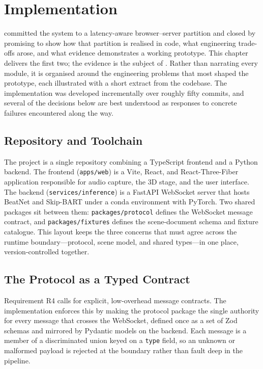 \chapter{Implementation}
\label{chap:implementation}

 committed the system to a latency-aware browser--server partition and closed by promising to show how that partition is realised in code, what engineering trade-offs arose, and what evidence demonstrates a working prototype. This chapter delivers the first two; the evidence is the subject of . Rather than narrating every module, it is organised around the engineering problems that most shaped the prototype, each illustrated with a short extract from the codebase. The implementation was developed incrementally over roughly fifty commits, and several of the decisions below are best understood as responses to concrete failures encountered along the way.

\section{Repository and Toolchain}

The project is a single repository combining a TypeScript frontend and a Python backend. The frontend (\texttt{apps/web}) is a Vite, React, and React-Three-Fiber application responsible for audio capture, the 3D stage, and the user interface. The backend (\texttt{services/inference}) is a FastAPI WebSocket server that hosts BeatNet and Skip-BART under a conda environment with PyTorch. Two shared packages sit between them: \texttt{packages/protocol} defines the WebSocket message contract, and \texttt{packages/fixtures} defines the scene-document schema and fixture catalogue. This layout keeps the three concerns that must agree across the runtime boundary---protocol, scene model, and shared types---in one place, version-controlled together.

\section{The Protocol as a Typed Contract}
\label{sec:impl-protocol}

Requirement R4 calls for explicit, low-overhead message contracts. The implementation enforces this by making the protocol package the single authority for every message that crosses the WebSocket, defined once as a set of Zod schemas and mirrored by Pydantic models on the backend. Each message is a member of a discriminated union keyed on a \texttt{type} field, so an unknown or malformed payload is rejected at the boundary rather than fault deep in the pipeline.

